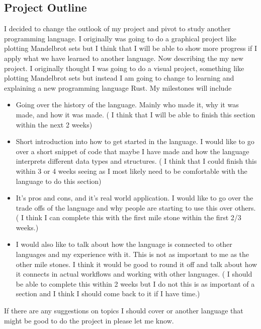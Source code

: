 \documentclass{article}
\theoremstyle{theorem}
\theoremstyle{definition}
\theoremstyle{remark}
\begin{document}
\subsection{Project Outline }
I decided to change the outlook of my project and pivot to study another programming language. I originally was going to do a graphical project like plotting Mandelbrot sets but I think that I will be able to show more progress if I apply what we have learned to another language. 
    Now describing the my new project. I originally thought I was going to do a visual project, something like plotting Mandelbrot sets but instead I am going to change to learning and explaining a new programming language Rust. My milestones will include 
    \begin{itemize}

\item Going over the history of the language. Mainly who made it, why it was made, and how it was made. ( I think that I will be able to finish this section within the next 2 weeks) 
\item Short introduction into how to get started in the language. I would like to go over a short snippet of code that maybe I have made and how the language interprets different data types and structures. ( I think that I could finish this within 3 or 4 weeks seeing as I most likely need to be comfortable with the language to do this section)
\item It’s pros and cons, and it's real world application. I would like to go over the trade offs of the language and why people are starting to use this over others. ( I think I can complete this with the first mile stone within the first 2/3 weeks.)
\item I would also like to talk about how the language is connected to other languages and my experience with it. This is not as important to me as the other mile stones. I think it would be good to round it off and talk about how it connects in actual workflows and working with other languages. ( I should be able to complete this within 2 weeks but I do not this is as important of a section and I think I should come back to it if I have time.)
\end{itemize}
If there are any suggestions on topics I should cover or another language that might be good to do the project in please let me know.
\end{document}
